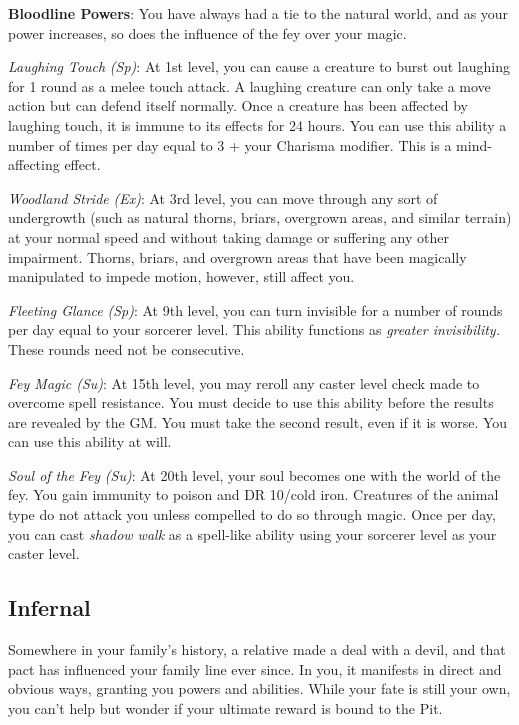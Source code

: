 \textbf{Bloodline Powers}: You have always had a tie to the natural world, and as your power increases, so does the influence of the fey over your magic.
				
\textit{Laughing Touch} \textit{(Sp)}: At 1st level, you can cause a creature to burst out laughing for 1 round as a melee touch attack. A laughing creature can only take a move action but can defend itself normally. Once a creature has been affected by laughing touch, it is immune to its effects for 24 hours. You can use this ability a number of times per day equal to 3 + your Charisma modifier. This is a mind-affecting effect.
				
\textit{Woodland Stride} \textit{(Ex)}: At 3rd level, you can move through any sort of undergrowth (such as natural thorns, briars, overgrown areas, and similar terrain) at your normal speed and without taking damage or suffering any other impairment. Thorns, briars, and overgrown areas that have been magically manipulated to impede motion, however, still affect you.
				
\textit{Fleeting Glance} \textit{(Sp)}: At 9th level, you can turn invisible for a number of rounds per day equal to your sorcerer level. This ability functions as \textit{greater invisibility. }These rounds need not be consecutive.
				
\textit{Fey Magic (Su)}: At 15th level, you may reroll any caster level check made to overcome spell resistance. You must decide to use this ability before the results are revealed by the GM. You must take the second result, even if it is worse. You can use this ability at will.
				
\textit{Soul of the Fey} \textit{(Su)}: At 20th level, your soul becomes one with the world of the fey. You gain immunity to poison and DR 10/cold iron. Creatures of the animal type do not attack you unless compelled to do so through magic. Once per day, you can cast \textit{shadow walk} as a spell-like ability using your sorcerer level as your caster level.
				
\subsection{Infernal}

				
Somewhere in your family's history, a relative made a deal with a devil, and that pact has influenced your family line ever since. In you, it manifests in direct and obvious ways, granting you powers and abilities. While your fate is still your own, you can't help but wonder if your ultimate reward is bound to the Pit.
				
